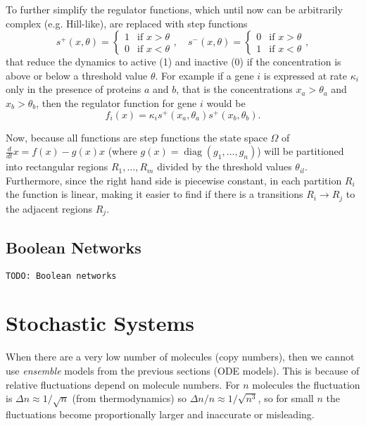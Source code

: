 \documentclass[a4paper]{article}
\newcommand{\todo}[1]{\texttt{TODO: #1}}
\theoremstyle{plain}
\theoremstyle{definition}
\theoremstyle{remark}
\begin{document}
To further simplify the regulator functions, which until now can be
arbitrarily complex (e.g. Hill-like), are replaced with step functions
\[
  s^+ (x, \theta) = \begin{cases}
    1 & \text{if } x > \theta \\
    0 & \text{if } x < \theta
  \end{cases},
  \quad
  s^- (x, \theta) = \begin{cases}
    0 & \text{if } x > \theta \\
    1 & \text{if } x < \theta
  \end{cases},
\]
that reduce the dynamics to active (1) and inactive (0) if the concentration
is above or below a threshold value $\theta$. For example if a gene $i$ is
expressed at rate $\kappa_i$ only in the presence of proteins $a$ and $b$,
that is the concentrations $x_a > \theta_a$ and $x_b > \theta_b$, then the
regulator function for gene $i$ would be
\[
  f_i(x) = \kappa_{i} s^+(x_a, \theta_a) s^+(x_b, \theta_b).
\]

Now, because all functions are step functions the state space $\Omega$ of
$\frac{d}{dt} x = f(x) - g(x) x$ (where $g(x) = \operatorname{diag}(g_1,
\ldots, g_n)$) will be partitioned into rectangular regions $R_1, \ldots, R_m$
divided by the threshold values $\theta_{il}$. Furthermore, since the right
hand side is piecewise constant, in each partition $R_i$ the function is
linear, making it easier to find if there is a transitions $R_i \to R_j$ to
the adjacent regions $R_j$.

\subsection{Boolean Networks}

\todo{Boolean networks}


\section{Stochastic Systems}

When there are a very low number of molecules (copy numbers), then we cannot
use \emph{ensemble} models from the previous sections (ODE models). This is
because of relative fluctuations depend on molecule numbers. For $n$ molecules
the fluctuation is $\Delta n \approx 1 / \sqrt{n}$ (from thermodynamics) so
$\Delta n / n \approx 1 / \sqrt{n^3}$, so for small $n$ the fluctuations
become proportionally larger and inaccurate or misleading.
\end{document}
